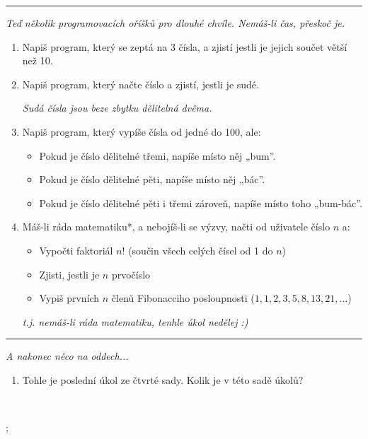 \documentclass[a4paper,10pt]{article}
\newcommand\startsection[1]{
     \vspace{0.2ex}
    \hrule
    {\fontspec{Oxygen} \tiny
     \vspace{-1ex}
     \emph{#1}
     \vspace{-1.5em}
    }
}
\begin{document}
\startsection{Teď několik programovacích oříšků pro dlouhé chvíle. Nemáš-li čas, přeskoč je.}

\begin{enumerate}[resume]

\item Napiš program, který se zeptá na 3 čísla,
    a zjistí jestli je jejich součet větší než 10.

\item Napiš program, který načte číslo a zjistí, jestli je sudé.

    \emph{\small Sudá čísla jsou beze \emph{zbytku} dělitelná dvěma.}

\item Napiš program, který vypíše čísla od jedné do 100, ale:
    \begin{itemize}
        \item Pokud je číslo dělitelné třemi, napíše místo něj „bum”.
        \item Pokud je číslo dělitelné pěti, napíše místo něj „bác”.
        \item Pokud je číslo dělitelné pěti i třemi zároveň, napíše místo toho „bum-bác”.
    \end{itemize}

\item Máš-li ráda matematiku*, a nebojíš-li se výzvy, načti od uživatele číslo $n$ a:
    \begin{itemize}
        \item Vypočti faktoriál $n!$ (součin všech celých čísel od 1 do $n$)
        \item Zjisti, jestli je $n$ prvočíslo
        \item Vypiš prvních $n$ členů Fibonacciho posloupnosti ($1, 1, 2, 3, 5, 8, 13, 21, \ldots $)
    \end{itemize}
    \emph{\small t.j. nemáš-li ráda matematiku, tenhle úkol nedělej :)}

\end{enumerate}

\startsection{A nakonec něco na oddech...}

\begin{enumerate}[resume]
\item Tohle je poslední úkol ze čtvrté sady. Kolik je v této sadě úkolů?

\end{enumerate}

\vfill
\hfill~%
\begin{tikz}
;
\end{tikz}
\end{document}
